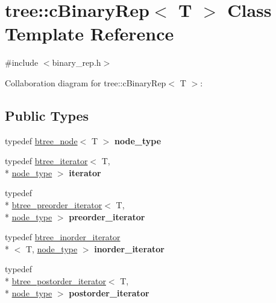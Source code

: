 \hypertarget{classtree_1_1cBinaryRep}{\section{tree\-:\-:c\-Binary\-Rep$<$ T $>$ Class Template Reference}
\label{classtree_1_1cBinaryRep}
}


{\ttfamily \#include $<$binary\-\_\-rep.\-h$>$}



Collaboration diagram for tree\-:\-:c\-Binary\-Rep$<$ T $>$\-:
\subsection*{Public Types}
\begin{DoxyCompactItemize}
\item 
\hypertarget{classtree_1_1cBinaryRep_a4218118406b4b792f771f2cffab1fe67}{typedef \hyperlink{structtree_1_1btree__node}{btree\-\_\-node}$<$ T $>$ {\bfseries node\-\_\-type}}\label{classtree_1_1cBinaryRep_a4218118406b4b792f771f2cffab1fe67}

\item 
\hypertarget{classtree_1_1cBinaryRep_af8646ca9dd6c8e2abc30f0a24eea2785}{typedef \hyperlink{classtree_1_1btree__iterator}{btree\-\_\-iterator}$<$ T, \\*
\hyperlink{structtree_1_1btree__node}{node\-\_\-type} $>$ {\bfseries iterator}}\label{classtree_1_1cBinaryRep_af8646ca9dd6c8e2abc30f0a24eea2785}

\item 
\hypertarget{classtree_1_1cBinaryRep_a80d54fe0461119770e3be144672dcbc6}{typedef \\*
\hyperlink{classtree_1_1btree__preorder__iterator}{btree\-\_\-preorder\-\_\-iterator}$<$ T, \\*
\hyperlink{structtree_1_1btree__node}{node\-\_\-type} $>$ {\bfseries preorder\-\_\-iterator}}\label{classtree_1_1cBinaryRep_a80d54fe0461119770e3be144672dcbc6}

\item 
\hypertarget{classtree_1_1cBinaryRep_ad1bba7a7672ee7bdf7ef4979a1b00879}{typedef \hyperlink{classtree_1_1btree__inorder__iterator}{btree\-\_\-inorder\-\_\-iterator}\\*
$<$ T, \hyperlink{structtree_1_1btree__node}{node\-\_\-type} $>$ {\bfseries inorder\-\_\-iterator}}\label{classtree_1_1cBinaryRep_ad1bba7a7672ee7bdf7ef4979a1b00879}

\item 
\hypertarget{classtree_1_1cBinaryRep_a7bef52fb6be8078a9d082c22f9054dd0}{typedef \\*
\hyperlink{classtree_1_1btree__postorder__iterator}{btree\-\_\-postorder\-\_\-iterator}$<$ T, \\*
\hyperlink{structtree_1_1btree__node}{node\-\_\-type} $>$ {\bfseries postorder\-\_\-iterator}}\label{classtree_1_1cBinaryRep_a7bef52fb6be8078a9d082c22f9054dd0}

\end{DoxyCompactItemize}
